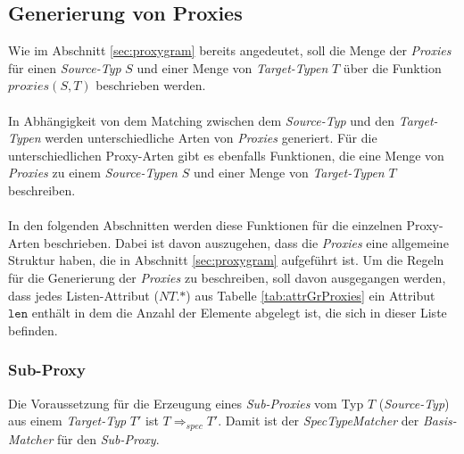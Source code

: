 \subsection{Generierung von Proxies}\label{sec_proxyGen}
Wie im Abschnitt \ref{sec:proxygram} bereits angedeutet, soll die Menge der \emph{Proxies} für einen \emph{Source-Typ} $S$ und einer Menge von \emph{Target-Typen} $T$ über die Funktion $\mathit{proxies(S,T)}$ beschrieben werden.
\\\\
In Abhängigkeit von dem Matching zwischen dem \emph{Source-Typ} und den \emph{Target-Typen} werden unterschiedliche Arten von \emph{Proxies} generiert. Für die unterschiedlichen Proxy-Arten gibt es ebenfalls Funktionen, die eine Menge von \emph{Proxies} zu einem \emph{Source-Typen} $S$ und einer Menge von \emph{Target-Typen} $T$ beschreiben.
\\\\
In den folgenden Abschnitten werden diese Funktionen für die einzelnen Proxy-Arten beschrieben. Dabei ist davon auszugehen, dass die \emph{Proxies} eine allgemeine Struktur haben, die in Abschnitt \ref{sec:proxygram} aufgeführt ist. Um die Regeln für die Generierung der \emph{Proxies} zu beschreiben, soll davon ausgegangen werden, dass jedes Listen-Attribut ($\mathit{NT.}\text{*}$) aus Tabelle \ref{tab:attrGrProxies} ein Attribut $\texttt{len}$ enthält in dem die Anzahl der Elemente abgelegt ist, die sich in dieser Liste befinden.


\subsubsection{Sub-Proxy}
Die Voraussetzung für die Erzeugung eines \emph{Sub-Proxies} vom Typ $T$ (\emph{Source-Typ}) aus einem \emph{Target-Typ} $T'$ ist $T \Rightarrow_{spec} T'$. Damit ist der \emph{SpecTypeMatcher} der \emph{Basis-Matcher} für den \emph{Sub-Proxy}.
